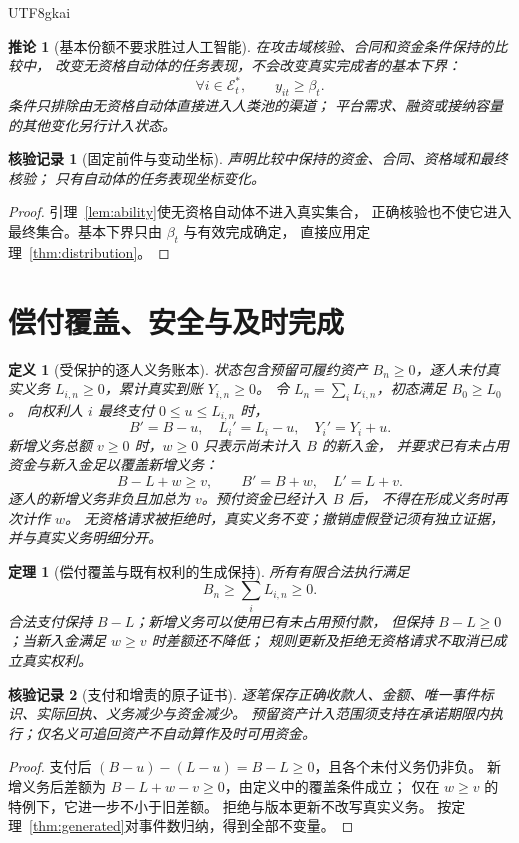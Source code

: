 \documentclass[12pt,a4paper,openany]{report}
\newtheorem{definition}{定义}[chapter]
\newtheorem{theorem}{定理}[chapter]
\newtheorem{corollary}{推论}[chapter]
\newtheorem{Certificate}{核验记录}[chapter]
\begin{document}
\begin{CJK*}{UTF8}{gkai}
\begin{corollary}[基本份额不要求胜过人工智能]
\label{cor:ai-independent}
在攻击域核验、合同和资金条件保持的比较中，
改变无资格自动体的任务表现，不会改变真实完成者的基本下界：
\[
\forall i\in\mathcal E_t^*,\qquad y_{it}\ge\beta_t.
\]
条件只排除由无资格自动体直接进入人类池的渠道；
平台需求、融资或接纳容量的其他变化另行计入状态。
\end{corollary}
\begin{Certificate}[固定前件与变动坐标]
声明比较中保持的资金、合同、资格域和最终核验；
只有自动体的任务表现坐标变化。
\end{Certificate}
\begin{proof}
引理~\ref{lem:ability}使无资格自动体不进入真实集合，
正确核验也不使它进入最终集合。基本下界只由 \(\beta_t\) 与有效完成确定，
直接应用定理~\ref{thm:distribution}。
\end{proof}

\section{偿付覆盖、安全与及时完成}
\begin{definition}[受保护的逐人义务账本]
\label{def:ledger}
状态包含预留可履约资产 \(B_n\ge0\)，逐人未付真实义务
\(L_{i,n}\ge0\)，累计真实到账 \(Y_{i,n}\ge0\)。
令 \(L_n=\sum_iL_{i,n}\)，初态满足 \(B_0\ge L_0\)。
向权利人 \(i\) 最终支付 \(0\le u\le L_{i,n}\) 时，
\[
B'=B-u,\quad L_i'=L_i-u,\quad Y_i'=Y_i+u.
\]
新增义务总额 \(v\ge0\) 时，\(w\ge0\) 只表示尚未计入 \(B\) 的新入金，
并要求已有未占用资金与新入金足以覆盖新增义务：
\[
B-L+w\ge v,\qquad B'=B+w,\quad L'=L+v.
\]
逐人的新增义务非负且加总为 \(v\)。预付资金已经计入 \(B\) 后，
不得在形成义务时再次计作 \(w\)。
无资格请求被拒绝时，真实义务不变；撤销虚假登记须有独立证据，
并与真实义务明细分开。
\end{definition}

\begin{theorem}[偿付覆盖与既有权利的生成保持]
\label{thm:ledger}
所有有限合法执行满足
\[
B_n\ge\sum_iL_{i,n}\ge0.
\]
合法支付保持 \(B-L\)；新增义务可以使用已有未占用预付款，
但保持 \(B-L\ge0\)；当新入金满足 \(w\ge v\) 时差额还不降低；
规则更新及拒绝无资格请求不取消已成立真实权利。
\end{theorem}
\begin{Certificate}[支付和增责的原子证书]
逐笔保存正确收款人、金额、唯一事件标识、实际回执、义务减少与资金减少。
预留资产计入范围须支持在承诺期限内执行；仅名义可追回资产不自动算作及时可用资金。
\end{Certificate}
\begin{proof}
支付后 \((B-u)-(L-u)=B-L\ge0\)，且各个未付义务仍非负。
新增义务后差额为 \(B-L+w-v\ge0\)，由定义中的覆盖条件成立；
仅在 \(w\ge v\) 的特例下，它进一步不小于旧差额。
拒绝与版本更新不改写真实义务。
按定理~\ref{thm:generated}对事件数归纳，得到全部不变量。
\end{proof}


\end{CJK*}
\end{document}

